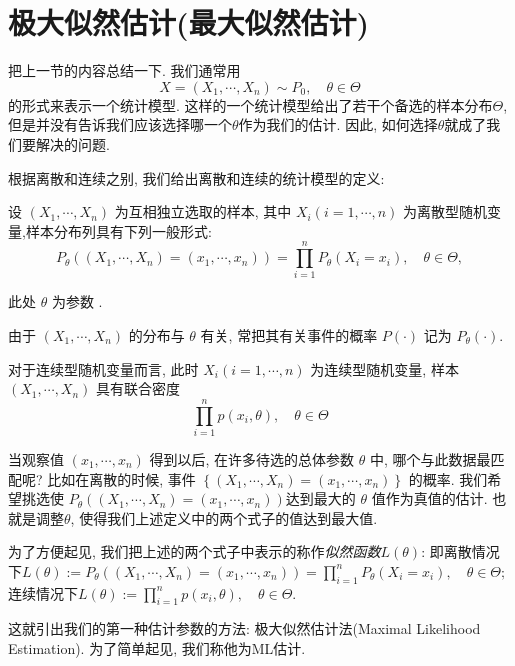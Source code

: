 \section{极大似然估计(最大似然估计)}

把上一节的内容总结一下. 我们通常用
$$
X=\left(X_1, \cdots, X_n\right) \sim P_0, \quad \theta \in \Theta
$$
的形式来表示一个统计模型. 这样的一个统计模型给出了若干个备选的样本分布$\Theta$, 但是并没有告诉我们应该选择哪一个$\theta$作为我们的估计. 因此, 如何选择$\theta$就成了我们要解决的问题. 

根据离散和连续之别, 我们给出离散和连续的统计模型的定义:

\begin{definition}
    \label{def:mle1}
    设 $\left(X_1, \cdots, X_n\right)$ 为互相独立选取的样本, 其中 $X_i(i=1, \cdots, n)$ 为离散型随机变量,样本分布列具有下列一般形式:
$$
P_\theta\left(\left(X_1, \cdots, X_n\right)=\left(x_1, \cdots, x_n\right)\right)=\prod_{i=1}^n P_\theta\left(X_i=x_i\right), \quad \theta \in \Theta,
$$

此处 $\theta$ 为参数 . 
\end{definition}

由于 $\left(X_1, \cdots, X_n\right)$ 的分布与 $\theta$ 有关, 常把其有关事件的概率 $P(\cdot)$ 记为 $P_\theta(\cdot)$.

\begin{definition}
    \label{def:mle2}
    对于连续型随机变量而言, 此时 $X_i(i=1, \cdots, n)$ 为连续型随机变量, 样本 $\left(X_1, \cdots, X_n\right)$ 具有联合密度
$$
\prod_{i=1}^n p\left(x_i, \theta\right), \quad \theta \in \Theta
$$
\end{definition}

当观察值 $\left(x_1, \cdots, x_n\right)$ 得到以后, 在许多待选的总体参数 $\theta$ 中, 哪个与此数据最匹配呢? 比如在离散的时候, 事件 $\left\{\left(X_1, \cdots, X_n\right)=\left(x_1, \cdots\right., \left.x_n\right)\right\}$ 的概率. 我们希望挑选使 $P_\theta\left(\left(X_1, \cdots, X_n\right)=\left(x_1, \cdots, x_n\right)\right)$达到最大的 $\theta$ 值作为真值的估计. 也就是调整$\theta$, 使得我们上述定义中的两个式子的值达到最大值. 

为了方便起见, 我们把上述的两个式子中表示的称作\emph{似然函数}$L(\theta)$: 即离散情况下$L(\theta):=P_\theta\left(\left(X_1, \cdots, X_n\right)=\left(x_1, \cdots, x_n\right)\right)=\prod_{i=1}^n P_\theta\left(X_i=x_i\right), \quad \theta \in \Theta;$连续情况下$L(\theta):=\prod_{i=1}^n p\left(x_i, \theta\right), \quad \theta \in \Theta$.

这就引出我们的第一种估计参数的方法: 极大似然估计法(Maximal Likelihood Estimation). 为了简单起见, 我们称他为ML估计. 

